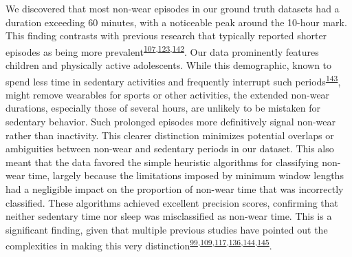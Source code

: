 \documentclass[
  10pt,
]{scrbook}
\begin{document}
We discovered that most non-wear episodes in our ground truth datasets
had a duration exceeding 60 minutes, with a noticeable peak around the
10-hour mark. This finding contrasts with previous research that
typically reported shorter episodes as being more
prevalent\textsuperscript{\protect\hyperlink{ref-aadland_comparison_2018}{107},\protect\hyperlink{ref-jaeschke_variability_2018}{123},\protect\hyperlink{ref-hutto_identifying_2013}{142}}.
Our data prominently features children and physically active
adolescents. While this demographic, known to spend less time in
sedentary activities and frequently interrupt such
periods\textsuperscript{\protect\hyperlink{ref-cooper_objectively_2015}{143}},
might remove wearables for sports or other activities, the extended
non-wear durations, especially those of several hours, are unlikely to
be mistaken for sedentary behavior. Such prolonged episodes more
definitively signal non-wear rather than inactivity. This clearer
distinction minimizes potential overlaps or ambiguities between non-wear
and sedentary periods in our dataset. This also meant that the data
favored the simple heuristic algorithms for classifying non-wear time,
largely because the limitations imposed by minimum window lengths had a
negligible impact on the proportion of non-wear time that was
incorrectly classified. These algorithms achieved excellent precision
scores, confirming that neither sedentary time nor sleep was
misclassified as non-wear time. This is a significant finding, given
that multiple previous studies have pointed out the complexities in
making this very
distinction\textsuperscript{\protect\hyperlink{ref-choi_validation_2011}{99},\protect\hyperlink{ref-duncan_wear-time_2018}{109},\protect\hyperlink{ref-doherty_large_2017}{117},\protect\hyperlink{ref-troiano_physical_2008}{136},\protect\hyperlink{ref-barouni_ambulatory_2020}{144},\protect\hyperlink{ref-mn_non-wear_2020}{145}}.
\end{document}
